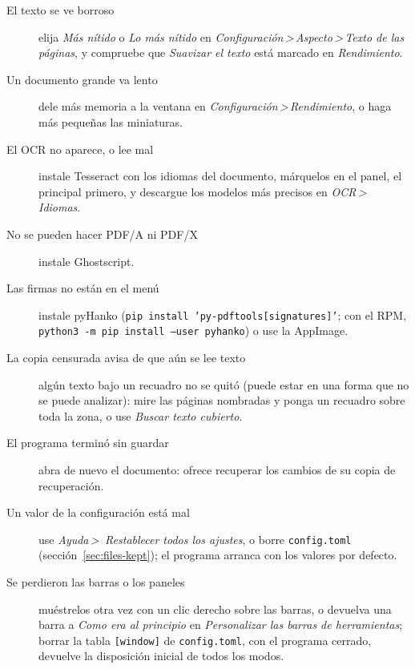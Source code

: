 \documentclass[12pt,
              article,
              oneside
              ]{memoir}
\newcommand*{\menu}[1]{\textit{#1}}
\newcommand*{\then}{\,>\,}
\begin{document}
%
\begin{description}
\item[El texto se ve borroso] elija \menu{Más nítido} o \menu{Lo más
  nítido} en \menu{Configuración\then Aspecto\then Texto de las páginas}, y
  compruebe que \menu{Suavizar el texto} está marcado en
  \menu{Rendimiento}.
\item[Un documento grande va lento] dele más memoria a la ventana en
  \menu{Configuración\then Rendimiento}, o haga más pequeñas las
  miniaturas.
\item[El OCR no aparece, o lee mal] instale Tesseract con los idiomas del
  documento, márquelos en el panel, el principal primero, y descargue los
  modelos más precisos en \menu{OCR\then Idiomas}.
\item[No se pueden hacer PDF/A ni PDF/X] instale Ghostscript.
\item[Las firmas no están en el menú] instale pyHanko
  (\texttt{pip install 'py-pdftools[signatures]'}; con el RPM,
  \texttt{python3 -m pip install --user pyhanko}) o use la AppImage.
\item[La copia censurada avisa de que aún se lee texto] algún texto bajo un
  recuadro no se quitó (puede estar en una forma que no se puede
  analizar): mire las páginas nombradas y ponga un recuadro sobre toda la
  zona, o use \menu{Buscar texto cubierto}.
\item[El programa terminó sin guardar] abra de nuevo el documento: ofrece
  recuperar los cambios de su copia de recuperación.
\item[Un valor de la configuración está mal] use \menu{Ayuda\then
  Restablecer todos los ajustes}, o borre \texttt{config.toml}
  (sección~\ref{sec:files-kept}); el programa arranca con los valores por
  defecto.
\item[Se perdieron las barras o los paneles] muéstrelos otra vez con un
  clic derecho sobre las barras, o devuelva una barra a \menu{Como era al
  principio} en \menu{Personalizar las barras de herramientas}; borrar la
  tabla \texttt{[window]} de \texttt{config.toml}, con el programa
  cerrado, devuelve la disposición inicial de todos los modos.
\end{description}
\end{document}
